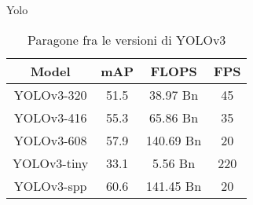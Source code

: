\documentclass[10pt]{beamer}
\begin{document}
\begin{frame}[allowframebreaks]{Yolo}
		\begin{table}[htpb]
			\centering
			\begin{tabular}{ |c|c|c|c| } 
				\hline
				Model & mAP & FLOPS & FPS \\
				\hline	
				 YOLOv3-320    & 51.5  &  38.97  Bn  &  45  \\ 
				 YOLOv3-416    & 55.3  &  65.86  Bn  &  35  \\ 
				 YOLOv3-608    & 57.9  &  140.69 Bn  &  20  \\ 
				 YOLOv3-tiny   & 33.1  &  5.56   Bn  &  220 \\
				 YOLOv3-spp    & 60.6  &  141.45 Bn  &  20  \\
				\hline
			\end{tabular}
		    \caption{Paragone fra le versioni di YOLOv3}
			\label{tab:comparison}
		\end{table}
		

\end{frame}
\end{document}
